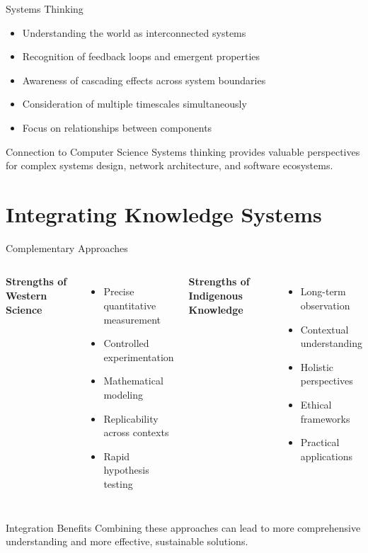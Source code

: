 \documentclass{beamer}
\begin{document}
\begin{frame}{Systems Thinking}
    \begin{itemize}
        \item Understanding the world as interconnected systems
        \item Recognition of feedback loops and emergent properties
        \item Awareness of cascading effects across system boundaries
        \item Consideration of multiple timescales simultaneously
        \item Focus on relationships between components
    \end{itemize}
    
    \begin{alertblock}{Connection to Computer Science}
        Systems thinking provides valuable perspectives for complex systems design, network architecture, and software ecosystems.
    \end{alertblock}
    
\end{frame}

\section{Integrating Knowledge Systems}

\begin{frame}{Complementary Approaches}
    \begin{columns}
        \textbf{Strengths of Western Science}
        \begin{itemize}
            \item Precise quantitative measurement
            \item Controlled experimentation
            \item Mathematical modeling
            \item Replicability across contexts
            \item Rapid hypothesis testing
        \end{itemize}
        
        \textbf{Strengths of Indigenous Knowledge}
        \begin{itemize}
            \item Long-term observation
            \item Contextual understanding
            \item Holistic perspectives
            \item Ethical frameworks
            \item Practical applications
        \end{itemize}
    \end{columns}
    
    \begin{block}{Integration Benefits}
        Combining these approaches can lead to more comprehensive understanding and more effective, sustainable solutions.
    \end{block}
\end{frame}
\end{document}
